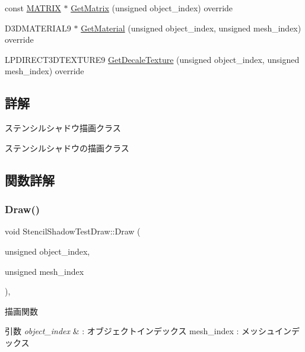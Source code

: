 \begin{DoxyCompactItemize}
\item 
const \mbox{\hyperlink{_vector3_d_8h_a032295cd9fb1b711757c90667278e744}{M\+A\+T\+R\+IX}} $\ast$ \mbox{\hyperlink{class_stencil_shadow_test_draw_adfa99798c61ac13f209dc99f1e2694c5}{Get\+Matrix}} (unsigned object\+\_\+index) override
\item 
D3\+D\+M\+A\+T\+E\+R\+I\+A\+L9 $\ast$ \mbox{\hyperlink{class_stencil_shadow_test_draw_abfc9caaaa1b6120e2013701a9d264f2d}{Get\+Material}} (unsigned object\+\_\+index, unsigned mesh\+\_\+index) override
\item 
L\+P\+D\+I\+R\+E\+C\+T3\+D\+T\+E\+X\+T\+U\+R\+E9 \mbox{\hyperlink{class_stencil_shadow_test_draw_a387a97781f743aa0ea0727c050ef53b2}{Get\+Decale\+Texture}} (unsigned object\+\_\+index, unsigned mesh\+\_\+index) override
\end{DoxyCompactItemize}


\subsection{詳解}
ステンシルシャドウ描画クラス 

ステンシルシャドウの描画クラス 

\subsection{関数詳解}
\mbox{\label{class_stencil_shadow_test_draw_abb5f9445b7d94c213a3751fa57e36643}} 
\subsubsection{\texorpdfstring{Draw()}{Draw()}}
{\footnotesize\ttfamily void Stencil\+Shadow\+Test\+Draw\+::\+Draw (\begin{DoxyParamCaption}\item[{unsigned}]{object\+\_\+index,  }\item[{unsigned}]{mesh\+\_\+index }\end{DoxyParamCaption})\hspace{0.3cm}{\ttfamily [override]}, {\ttfamily [virtual]}}



描画関数 


\begin{DoxyParams}{引数}
{\em object\+\_\+index} & \+: オブジェクトインデックス mesh\+\_\+index \+: メッシュインデックス \\
\hline
\end{DoxyParams}


